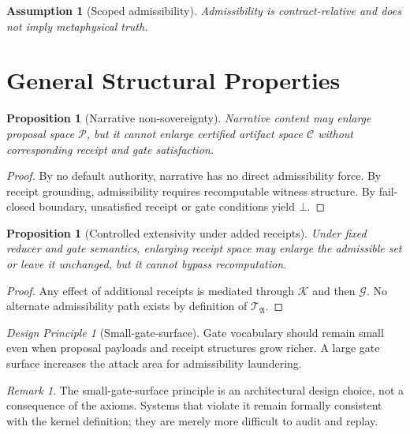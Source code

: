 \documentclass[12pt]{amsart}
\numberwithin{equation}{section}
\newtheorem{proposition}[theorem]{Proposition}
\newtheorem{assumption}[theorem]{Assumption}
\theoremstyle{definition}
\theoremstyle{remark}
\newtheorem{remark}[theorem]{Remark}
\newtheorem{principle}[theorem]{Design Principle}
\newcommand{\PP}{\mathcal P}
\newcommand{\KK}{\mathcal K}
\newcommand{\GG}{\mathcal G}
\newcommand{\CC}{\mathcal C}
\newcommand{\TT}{\mathcal T}
\begin{document}
\begin{assumption}[Scoped admissibility]
Admissibility is contract-relative and does not imply metaphysical truth.
\end{assumption}

\section{General Structural Properties}

\begin{proposition}[Narrative non-sovereignty]
Narrative content may enlarge proposal space $\PP$, but it cannot enlarge certified artifact
space $\CC$ without corresponding receipt and gate satisfaction.
\end{proposition}

\begin{proof}
By no default authority, narrative has no direct admissibility force.  By receipt grounding,
admissibility requires recomputable witness structure.  By fail-closed boundary, unsatisfied
receipt or gate conditions yield $\bot$.
\end{proof}

\begin{proposition}[Controlled extensivity under added receipts]
Under fixed reducer and gate semantics, enlarging receipt space may enlarge the admissible set
or leave it unchanged, but it cannot bypass recomputation.
\end{proposition}

\begin{proof}
Any effect of additional receipts is mediated through $\KK$ and then $\GG$.  No alternate
admissibility path exists by definition of $\TT_{\mathfrak A}$.
\end{proof}

\begin{principle}[Small-gate-surface]
Gate vocabulary should remain small even when proposal payloads and receipt structures grow
richer.  A large gate surface increases the attack area for admissibility laundering.
\end{principle}

\begin{remark}
The small-gate-surface principle is an architectural design choice, not a consequence of the
axioms.  Systems that violate it remain formally consistent with the kernel definition; they
are merely more difficult to audit and replay.
\end{remark}
\end{document}

